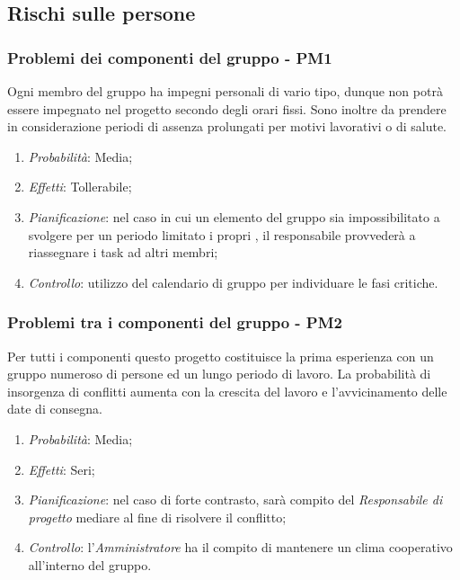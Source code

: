 \subsection{Rischi sulle persone}
\subsubsection{Problemi dei componenti del gruppo - PM1}
Ogni membro del gruppo ha impegni personali di vario tipo, dunque non potr\`a essere impegnato nel progetto secondo degli orari fissi. Sono inoltre da prendere in considerazione periodi di assenza prolungati per motivi lavorativi o di salute.
\begin{enumerate}
\item \textit{Probabilit\`a}: Media;
\item \textit{Effetti}: Tollerabile;
\item \textit{Pianificazione}: nel caso in cui un elemento del gruppo sia impossibilitato a svolgere per un periodo limitato i propri , il responsabile provveder\`a a riassegnare i task ad altri membri;
\item \textit{Controllo}: utilizzo del calendario di gruppo per individuare le fasi critiche.
\end{enumerate}

\subsubsection{Problemi tra i componenti del gruppo - PM2}
Per tutti i componenti questo progetto costituisce la prima esperienza con un gruppo numeroso di persone ed un lungo periodo di lavoro. La probabilit\`a di insorgenza di conflitti aumenta con la crescita del lavoro e l'avvicinamento delle date di consegna.
\begin{enumerate}
\item \textit{Probabilit\`a}: Media;
\item \textit{Effetti}: Seri;
\item \textit{Pianificazione}: nel caso di forte contrasto, sar\`a compito del \textit{Responsabile di progetto} mediare al fine di risolvere il conflitto;
\item \textit{Controllo}: l'\textit{Amministratore} ha il compito di mantenere un clima cooperativo all'interno del gruppo.
\end{enumerate} 

